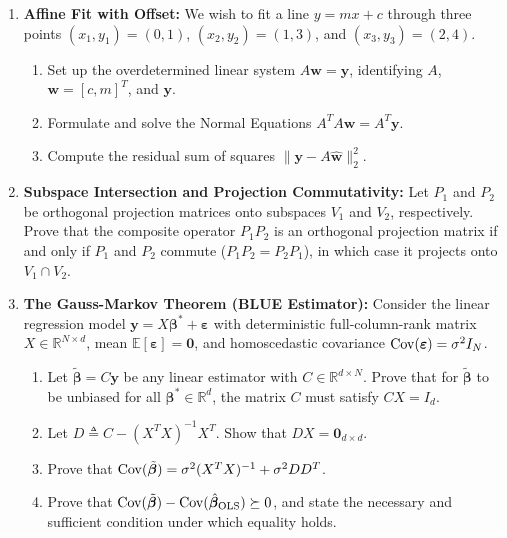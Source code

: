 \begin{enumerate}[label=\textbf{P\arabic*.}]
    \item \textbf{Affine Fit with Offset:}
    We wish to fit a line $y = mx + c$ through three points $(x_1, y_1) = (0, 1)$, $(x_2, y_2) = (1, 3)$, and $(x_3, y_3) = (2, 4)$.
    \begin{enumerate}[label=(\alph*)]
        \item Set up the overdetermined linear system $A\mathbf{w} = \mathbf{y}$, identifying $A$, $\mathbf{w} = [c, m]^T$, and $\mathbf{y}$.
        \item Formulate and solve the Normal Equations $A^T A \mathbf{w} = A^T \mathbf{y}$.
        \item Compute the residual sum of squares $\|\mathbf{y} - A\hat{\mathbf{w}}\|_2^2$.
    \end{enumerate}

    \item \textbf{Subspace Intersection and Projection Commutativity:}
    Let $P_1$ and $P_2$ be orthogonal projection matrices onto subspaces $V_1$ and $V_2$, respectively.
    Prove that the composite operator $P_1 P_2$ is an orthogonal projection matrix if and only if $P_1$ and $P_2$ commute ($P_1 P_2 = P_2 P_1$), in which case it projects onto $V_1 \cap V_2$.

    \item \textbf{The Gauss-Markov Theorem (BLUE Estimator):}
    Consider the linear regression model $\mathbf{y} = X\boldsymbol{\beta}^* + \boldsymbol{\varepsilon}$ with deterministic full-column-rank matrix $X \in \mathbb{R}^{N \times d}$, mean $\mathbb{E}[\boldsymbol{\varepsilon}] = \mathbf{0}$, and homoscedastic covariance $\operatorname{Cov}(\boldsymbol{\varepsilon}) = \sigma^2 I_N$.
    \begin{enumerate}[label=(\alph*)]
        \item Let $\tilde{\boldsymbol{\beta}} = C \mathbf{y}$ be any linear estimator with $C \in \mathbb{R}^{d \times N}$. Prove that for $\tilde{\boldsymbol{\beta}}$ to be unbiased for all $\boldsymbol{\beta}^* \in \mathbb{R}^d$, the matrix $C$ must satisfy $C X = I_d$.
        \item Let $D \triangleq C - (X^T X)^{-1} X^T$. Show that $D X = \mathbf{0}_{d \times d}$.
        \item Prove that $\operatorname{Cov}(\tilde{\boldsymbol{\beta}}) = \sigma^2 (X^T X)^{-1} + \sigma^2 D D^T$.
        \item Prove that $\operatorname{Cov}(\tilde{\boldsymbol{\beta}}) - \operatorname{Cov}(\hat{\boldsymbol{\beta}}_{\mathrm{OLS}}) \succeq 0$, and state the necessary and sufficient condition under which equality holds.
    \end{enumerate}


\end{enumerate}
